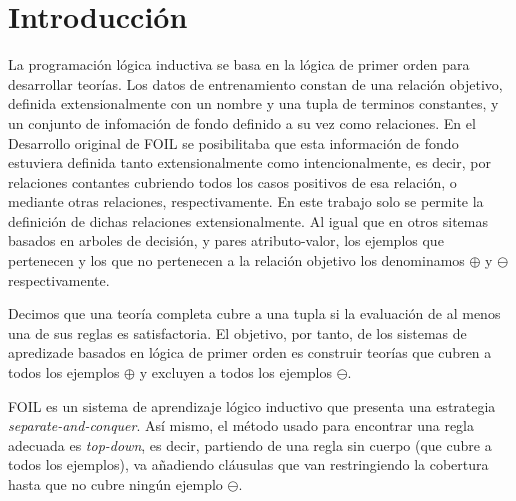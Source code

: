 \section{Introducción}
La programación lógica inductiva se basa en la lógica de primer orden para desarrollar teorías. Los datos de entrenamiento constan de una relación objetivo, definida extensionalmente con un nombre y una tupla de terminos constantes, y un conjunto de infomación de fondo definido a su vez como relaciones. En el Desarrollo original de FOIL se posibilitaba que esta información de fondo estuviera definida tanto extensionalmente como intencionalmente, es decir, por relaciones contantes cubriendo todos los casos positivos de esa relación, o mediante otras relaciones, respectivamente. En este trabajo solo se permite la definición de dichas relaciones extensionalmente. Al igual que en otros sitemas basados en arboles de decisión, y pares atributo-valor, los ejemplos que pertenecen y los que no pertenecen a la relación objetivo los denominamos $\oplus$ y $\ominus$ respectivamente.


Decimos que una teoría completa cubre a una tupla si la evaluación de al menos una de sus reglas es satisfactoria. El objetivo, por tanto, de los sistemas de apredizade basados en lógica de primer orden es construir teorías que cubren a todos los ejemplos $\oplus$ y excluyen a todos los ejemplos $\ominus$.


FOIL es un sistema de aprendizaje lógico inductivo que presenta una estrategia \emph{separate-and-conquer}. Así mismo, el método usado para encontrar una regla adecuada es \emph{top-down}, es decir, partiendo de una regla sin cuerpo (que cubre a todos los ejemplos), va añadiendo cláusulas que van restringiendo la cobertura hasta que no cubre ningún ejemplo $\ominus$.
